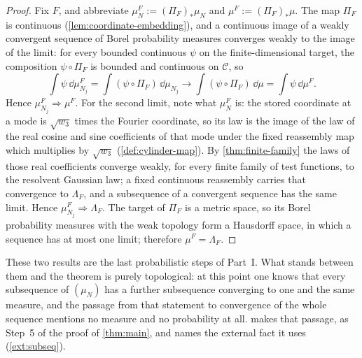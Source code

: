 \begin{proof}
Fix $F$, and abbreviate $\mu_N^F:=(\Pi_F)_*\mu_N$ and
$\mu^F:=(\Pi_F)_*\mu$. The map $\Pi_F$ is continuous
(\cref{lem:coordinate-embedding}), and a continuous image of a weakly convergent
sequence of Borel probability measures converges weakly to the image of the
limit: for every bounded continuous $\psi$ on the finite-dimensional target, the
composition $\psi\circ\Pi_F$ is bounded and continuous on $\mathcal C$, so
\[
  \int\psi\,\dd\mu_{N_j}^F
  =\int(\psi\circ\Pi_F)\,\dd\mu_{N_j}
  \longrightarrow\int(\psi\circ\Pi_F)\,\dd\mu
  =\int\psi\,\dd\mu^F .
\]
Hence $\mu_{N_j}^F\Rightarrow\mu^F$. For the second limit, note what
$\mu_N^F$ is: the stored coordinate at a mode is $\sqrt{w_3}$ times the Fourier
coordinate, so its law is the image of the law of the real cosine and sine
coefficients of that mode under the fixed reassembly map which multiplies by
$\sqrt{w_3}$ (\cref{def:cylinder-map}). By \cref{thm:finite-family} the laws of
those real coefficients converge weakly, for every finite family of test
functions, to the resolvent Gaussian law; a fixed continuous reassembly carries
that convergence to $\Lambda_F$, and a subsequence of a convergent sequence has
the same limit. Hence $\mu_{N_j}^F\Rightarrow\Lambda_F$. The target of $\Pi_F$
is a metric space, so its Borel probability measures with the weak topology form
a Hausdorff space, in which a sequence has at most one limit; therefore
$\mu^F=\Lambda_F$.
\end{proof}

These two results are the last probabilistic steps of Part~I. What stands
between them and the theorem is purely topological: at this point one knows that
every subsequence of $(\mu_N)$ has a further subsequence converging to one and
the same measure, and the passage from that statement to convergence of the
whole sequence mentions no measure and no probability at all. 
makes that passage, as Step~5 of the proof of \cref{thm:main}, and names the
external fact it uses (\cref{ext:subseq}).
